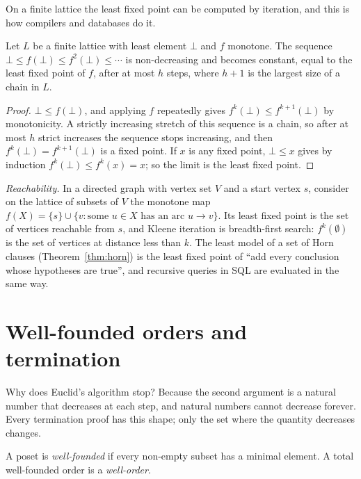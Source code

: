 On a finite lattice the least fixed point can be computed by iteration, and this is how compilers and databases do
it.

\begin{proposition}\label{prop:kleene}
Let $L$ be a finite lattice with least element $\bot$ and $f$ monotone. The sequence $\bot\le f(\bot)\le f^2(\bot)\le\cdots$ is non-decreasing and
becomes constant, equal to the least fixed point of $f$, after at most $h$ steps, where $h+1$ is the largest size of a chain in $L$.
\end{proposition}
\begin{proof}
$\bot\le f(\bot)$, and applying $f$ repeatedly gives $f^k(\bot)\le f^{k+1}(\bot)$ by monotonicity. A strictly increasing stretch of this sequence
is a chain, so after at most $h$ strict increases the sequence stops increasing, and then $f^k(\bot)=f^{k+1}(\bot)$ is a fixed point. If $x$ is
any fixed point, $\bot\le x$ gives by induction $f^k(\bot)\le f^k(x)=x$; so the limit is the least fixed point.
\end{proof}

\begin{example}\label{ex:reach}
\emph{Reachability.} In a directed graph with vertex set $V$ and a start vertex $s$, consider on the lattice of subsets of $V$ the
monotone map $f(X)=\{s\}\cup\{v:\text{some }u\in X\text{ has an arc }u\to v\}$. Its least fixed point is the set of vertices reachable from $s$, and Kleene
iteration is breadth-first search: $f^k(\emptyset)$ is the set of vertices at distance less than $k$. The least model of a set of Horn
clauses (Theorem~\ref{thm:horn}) is the least fixed point of ``add every conclusion whose hypotheses are true'', and recursive
queries in SQL are evaluated in the same way.
\end{example}

\section{Well-founded orders and termination}

Why does Euclid's algorithm stop? Because the second argument is a natural number that decreases at each step, and
natural numbers cannot decrease forever. Every termination proof has this shape; only the set where the quantity
decreases changes.

\begin{definition}\label{def:wf}
A poset is \emph{well-founded} if every non-empty subset has a minimal element. A total well-founded order is a
\emph{well-order}.
\end{definition}

